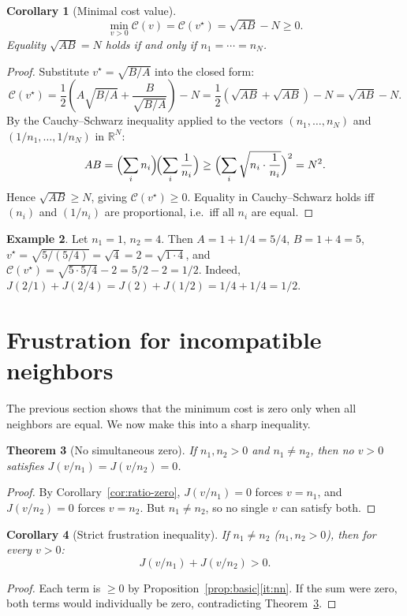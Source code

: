\documentclass[11pt]{amsart}
\newtheorem{theorem}{Theorem}[section]
\newtheorem{corollary}[theorem]{Corollary}
\theoremstyle{definition}
\newtheorem{example}[theorem]{Example}
\theoremstyle{remark}
\newcommand{\R}{\mathbb{R}}
\begin{document}
\begin{corollary}[Minimal cost value]\label{cor:minvalue}
\[
\min_{v>0}\mathcal C(v)
=\mathcal C(v^\star)
=\sqrt{AB}-N\ge0.
\]
Equality $\sqrt{AB}=N$ holds if and only if $n_1=\cdots=n_N$.
\end{corollary}
\begin{proof}
Substitute $v^\star=\sqrt{B/A}$ into the closed form:
\[
\mathcal C(v^\star)
=\frac12\!\left(A\sqrt{B/A}+\frac{B}{\sqrt{B/A}}\right)-N
=\frac12\!\left(\sqrt{AB}+\sqrt{AB}\right)-N
=\sqrt{AB}-N.
\]
By the Cauchy--Schwarz inequality applied to the vectors
$(n_1,\dots,n_N)$ and $(1/n_1,\dots,1/n_N)$ in $\R^N$:
\[
AB=\Bigl(\sum_i n_i\Bigr)\!\Bigl(\sum_i \frac1{n_i}\Bigr)
\ge\Bigl(\sum_i\sqrt{n_i\cdot\frac1{n_i}}\Bigr)^2=N^2.
\]
Hence $\sqrt{AB}\ge N$, giving $\mathcal C(v^\star)\ge0$.
Equality in Cauchy--Schwarz holds iff $(n_i)$ and $(1/n_i)$ are
proportional, i.e.\ iff all $n_i$ are equal.
\end{proof}

\begin{example}\label{ex:two-bond}
Let $n_1=1$, $n_2=4$.  Then $A=1+1/4=5/4$, $B=1+4=5$,
$v^\star=\sqrt{5/(5/4)}=\sqrt{4}=2=\sqrt{1\cdot4}$, and
$\mathcal C(v^\star)=\sqrt{5\cdot 5/4}-2=5/2-2=1/2$.
Indeed, $J(2/1)+J(2/4)=J(2)+J(1/2)=1/4+1/4=1/2$.
\end{example}

\section{Frustration for incompatible neighbors}\label{sec:frustration}

The previous section shows that the minimum cost is zero only when all
neighbors are equal.  We now make this into a sharp inequality.

\begin{theorem}[No simultaneous zero]\label{thm:nozero}
If $n_1,n_2>0$ and $n_1\neq n_2$, then no $v>0$ satisfies
$J(v/n_1)=J(v/n_2)=0$.
\end{theorem}
\begin{proof}
By Corollary~\ref{cor:ratio-zero}, $J(v/n_1)=0$ forces $v=n_1$,
and $J(v/n_2)=0$ forces $v=n_2$.  But $n_1\neq n_2$, so no single
$v$ can satisfy both.
\end{proof}

\begin{corollary}[Strict frustration inequality]\label{cor:strict-frustration}
If $n_1\neq n_2$ ($n_1,n_2>0$), then for every $v>0$:
\[
J(v/n_1)+J(v/n_2)>0.
\]
\end{corollary}
\begin{proof}
Each term is $\ge0$ by Proposition~\ref{prop:basic}\ref{it:nn}.
If the sum were zero, both terms would individually be zero,
contradicting Theorem~\ref{thm:nozero}.
\end{proof}
\end{document}
